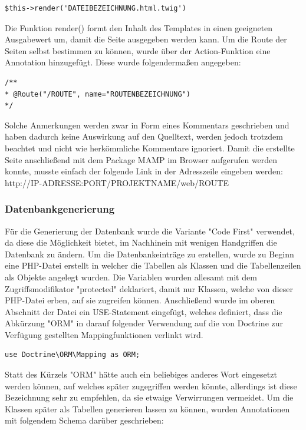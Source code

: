 	\lstset{language=php}
  	\begin{lstlisting}
$this->render('DATEIBEZEICHNUNG.html.twig')
  	\end{lstlisting}
Die Funktion render() formt den Inhalt des Templates in einen geeigneten Ausgabewert um, damit die Seite ausgegeben werden kann.
Um die Route der Seiten selbst bestimmen zu können, wurde über der Action-Funktion eine Annotation hinzugefügt. Diese wurde folgendermaßen angegeben:
	\lstset{language=php}
  	\begin{lstlisting}
/**
* @Route("/ROUTE", name="ROUTENBEZEICHNUNG")
*/
  	\end{lstlisting}
Solche Anmerkungen werden zwar in Form eines Kommentars geschrieben und haben dadurch keine Auswirkung auf den Quelltext, werden jedoch trotzdem beachtet und nicht wie herkömmliche Kommentare ignoriert.
Damit die erstellte Seite anschließend mit dem Package MAMP im Browser aufgerufen werden konnte, musste einfach der folgende Link in der Adresszeile eingeben werden:\\
http://IP-ADRESSE:PORT/PROJEKTNAME/web/ROUTE

    \subsubsection{Datenbankgenerierung}

Für die Generierung der Datenbank wurde die Variante "Code First" verwendet, da diese die Möglichkeit bietet, im Nachhinein mit wenigen Handgriffen die Datenbank zu ändern.
Um die Datenbankeinträge zu erstellen, wurde zu Beginn eine PHP-Datei erstellt in welcher die Tabellen als Klassen und die Tabellenzeilen als Objekte angelegt wurden. Die Variablen wurden allesamt mit dem Zugriffsmodifikator "protected" deklariert, damit nur Klassen, welche von dieser PHP-Datei erben, auf sie zugreifen können. Anschließend wurde im oberen Abschnitt der Datei ein USE-Statement eingefügt, welches definiert, dass die Abkürzung "ORM" in darauf folgender Verwendung auf die von Doctrine zur Verfügung gestellten Mappingfunktionen verlinkt wird.
	
	\lstset{language=php}
  	\begin{lstlisting}
use Doctrine\ORM\Mapping as ORM;
  	\end{lstlisting}
Statt des Kürzels "ORM" hätte auch ein beliebiges anderes Wort eingesetzt werden können, auf welches später zugegriffen werden könnte, allerdings ist diese Bezeichnung sehr zu empfehlen, da sie etwaige Verwirrungen vermeidet.
Um die Klassen später als Tabellen generieren lassen zu können, wurden Annotationen mit folgendem Schema darüber geschrieben:
	
